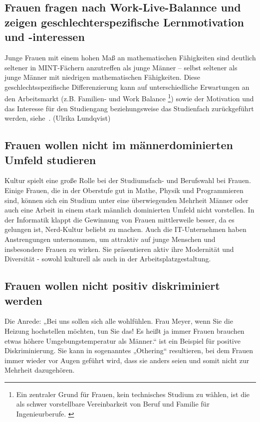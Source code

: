 \documentclass[a4paper, 12 pt]{IEEEtran}
\begin{document}
\subsection{Frauen fragen nach Work-Live-Balannce und zeigen geschlechterspezifische Lernmotivation und -interessen}
Junge Frauen mit einem hohen Maß an mathematischen Fähigkeiten sind deutlich seltener in MINT-Fächern anzutreffen als junge Männer – selbst seltener als junge Männer mit niedrigen mathematischen Fähigkeiten. Diese geschlechtsspezifische Differenzierung kann auf unterschiedliche Erwartungen an den Arbeitsmarkt (z.B. Familien- und Work Balance
\footnote{Ein zentraler Grund für Frauen, kein technisches Studium zu wählen, ist die als schwer vorstellbare Vereinbarkeit von Beruf und Familie für Ingenieurberufe. \cite{Hausotter.2022}}) 
sowie der Motivation und das Interesse für den Studiengang beziehungsweise das Studienfach zurückgeführt  werden, siehe~\cite{Hango.2013}.  (Ulrika Lundqvist)

\subsection{Frauen wollen nicht im männerdominierten Umfeld studieren}
Kultur spielt eine große Rolle bei der Studiumsfach- und Berufswahl bei Frauen.
Einige Frauen, die in der Oberstufe gut in Mathe, Physik und Programmieren sind, können sich ein Studium unter eine überwiegenden Mehrheit Männer oder auch eine Arbeit in einem stark männlich dominierten Umfeld  nicht vorstellen. 
In der Informatik klappt die Gewinnung von Frauen mittlerweile besser, da es gelungen ist, Nerd-Kultur beliebt zu machen. Auch die IT-Unternehmen haben Anstrengungen unternommen, um attraktiv auf junge Menschen und insbesondere Frauen zu wirken. Sie präsentieren aktiv ihre Modernität und Diversität - sowohl kulturell als auch in der Arbeitsplatzgestaltung. 

\subsection{Frauen wollen nicht positiv diskriminiert werden}
Die Anrede: „Bei uns sollen sich alle wohlfühlen. Frau Meyer, wenn Sie die Heizung hochstellen möchten, tun Sie das! Es heißt ja immer Frauen brauchen etwas höhere Umgebungstemperatur als Männer.“ ist ein Beispiel für positive Diskriminierung. Sie kann in sogenanntes „Othering“ resultieren, bei dem Frauen immer wieder vor Augen geführt wird, dass sie anders seien und somit nicht zur Mehrheit dazugehören.
\end{document}
